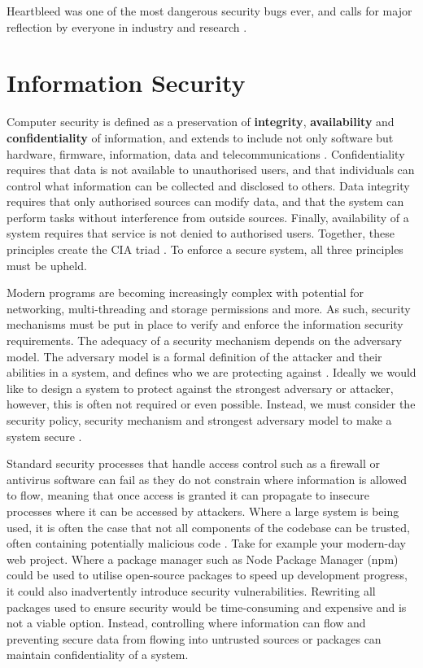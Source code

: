 \documentclass[twocolumn]{article}
\begin{document}
Heartbleed was one of the most dangerous security bugs ever, and calls for major reflection by everyone in industry and research \cite{balliu2014logics}.

\section{Information Security}

Computer security is defined as a preservation of \textbf{integrity}, \textbf{availability} and \textbf{confidentiality} of information, and extends to include not only software but hardware, firmware, information, data and telecommunications \cite{guttman1995introduction}.
Confidentiality requires that data is not available to unauthorised users, and that individuals can control what information can be collected and disclosed to others. Data integrity requires that only authorised sources can modify data, and that the system can perform tasks without interference from outside sources. Finally, availability of a system requires that service is not denied to authorised users. Together, these principles create the CIA triad \cite{stallings2012computer}. To enforce a secure system, all three principles must be upheld.

Modern programs are becoming increasingly complex with potential for networking, multi-threading and storage permissions and more. As such, security mechanisms must be put in place to verify and enforce the information security requirements. The adequacy of a security mechanism depends on the adversary model. The adversary model is a formal definition of the attacker and their abilities in a system, and defines who we are protecting against \cite{do2019role}. Ideally we would like to design a system to protect against the strongest adversary or attacker, however, this is often not required or even possible. Instead, we must consider the security policy, security mechanism and strongest adversary model to make a system secure \cite{balliu2014logics}.

Standard security processes that handle access control such as a firewall or antivirus software can fail as they do not constrain where information is allowed to flow, meaning that once access is granted it can propagate to insecure processes where it can be accessed by attackers. Where a large system is being used, it is often the case that not all components of the codebase can be trusted, often containing potentially malicious code \cite{sabelfeld2003language}. Take for example your modern-day web project. Where a package manager such as Node Package Manager (npm) could be used to utilise open-source packages to speed up development progress, it could also inadvertently introduce security vulnerabilities. Rewriting all packages used to ensure security would be time-consuming and expensive and is not a viable option. Instead, controlling where information can flow and preventing secure data from flowing into untrusted sources or packages can maintain confidentiality of a system.
\end{document}
